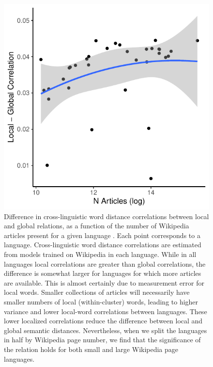 \documentclass[9pt,twoside,lineno]{pnas-new}
\begin{document}
 \begin{figure}[h]
\centering
     \includegraphics[width = 5in]{suppfigs/local_global_articles.pdf}
         \caption{Difference in cross-linguistic word distance correlations between local and global relations, as a function of the number of Wikipedia articles present for a given language \cite{wikispeakers}. Each point corresponds to a language.  Cross-linguistic word distance correlations are estimated from models trained on Wikipedia in each language. While in all languages local correlations are greater than global correlations, the difference is somewhat larger for languages for which more articles are available. This is almost certainly due to measurement error for local words. Smaller collections of articles will necessarily have smaller numbers of local (within-cluster) words, leading to higher variance and lower local-word correlations between languages. These lower localized correlations reduce the difference between local and global semantic distances. Nevertheless, when we split the languages in half by Wikipedia page number, we find that the significance of the relation holds for both small and large Wikipedia page languages.
}
\end{figure}

\pagebreak
 \clearpage
 
 
\end{document}

